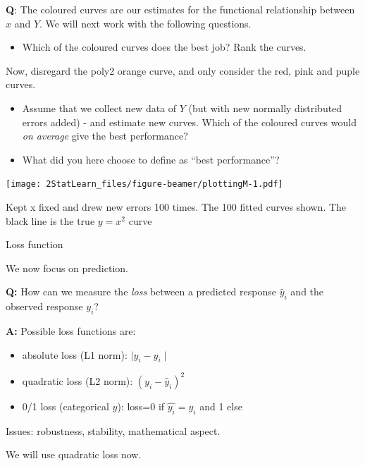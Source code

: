 \documentclass[ignorenonframetext,]{beamer}
\providecommand{\tightlist}{%
  \setlength{\itemsep}{0pt}\setlength{\parskip}{0pt}}
\begin{document}
\begin{frame}

\textbf{Q}: The coloured curves are our estimates for the functional
relationship between \(x\) and \(Y\). We will next work with the
following questions.

\begin{itemize}
\tightlist
\item
  Which of the coloured curves does the best job? Rank the curves.
\end{itemize}

Now, disregard the poly2 orange curve, and only consider the red, pink
and puple curves.

\begin{itemize}
\tightlist
\item
  Assume that we collect new data of \(Y\) (but with new normally
  distributed errors added) - and estimate new curves. Which of the
  coloured curves would \emph{on average} give the best performance?
\item
  What did you here choose to define as ``best performance''?
\end{itemize}

\end{frame}

\begin{frame}

\texttt{[image: 2StatLearn\_files/figure-beamer/plottingM-1.pdf]}

Kept x fixed and drew new errors 100 times. The 100 fitted curves shown.
The black line is the true \(y=x^2\) curve

\end{frame}

\begin{frame}

\begin{block}{Loss function}

We now focus on prediction.

\textbf{Q:} How can we measure the \emph{loss} between a predicted
response \(\hat{y}_i\) and the observed response \(y_i\)?

\textbf{A:} Possible loss functions are:

\begin{itemize}
\tightlist
\item
  absolute loss (L1 norm): \(\mid y_i-\hat{y}_i\mid\)
\item
  quadratic loss (L2 norm): \((y_i-\hat{y}_i)^2\)
\item
  0/1 loss (categorical \(y\)): loss=0 if \(\hat{y_i}=y_i\) and 1 else
\end{itemize}

Issues: robustness, stability, mathematical aspect.

We will use quadratic loss now.

\end{block}

\end{frame}
\end{document}
